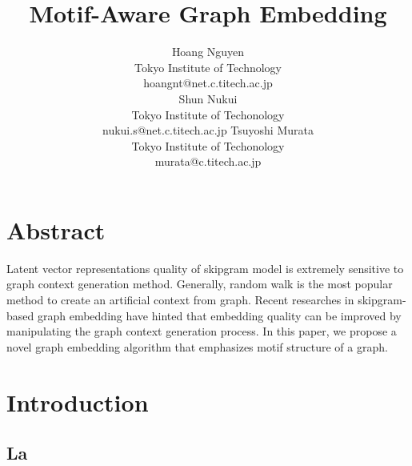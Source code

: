 \documentclass[letterpaper]{article}
\title{Motif-Aware Graph Embedding}
\author{
    Hoang Nguyen \\
    Tokyo Institute of Technology \\
    hoangnt@net.c.titech.ac.jp \\
    \And 
    Shun Nukui \\ 
    Tokyo Institute of Techonology \\
    nukui.s@net.c.titech.ac.jp 
    \And 
    Tsuyoshi Murata \\
    Tokyo Institute of Techonology \\
    murata@c.titech.ac.jp 
}
\begin{document}
    \maketitle

    \section{Abstract}
        Latent vector representations quality of skipgram model is extremely sensitive to 
        graph context generation method. Generally, random walk is the most popular method
        to create an artificial context from graph. Recent researches in skipgram-based 
        graph embedding have hinted that embedding quality can be improved by manipulating
        the graph context generation process. In this paper, we propose a novel graph embedding
        algorithm that emphasizes motif structure of a graph. 

    \setcounter{secnumdepth}{2}
    \section{Introduction}
        \subsection{La}
\end{document}
